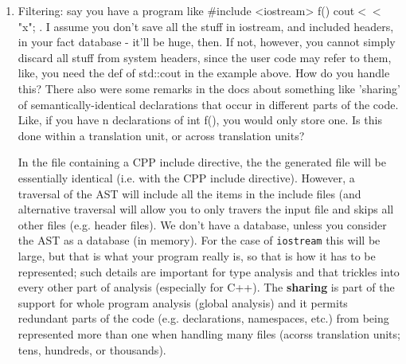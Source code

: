 \begin{enumerate}
   We support whole program analysis by permitting the AST's from several files to be
   merged, this saves space in the header file duplication and provides an efficient means
   of handling large scale applications.  This work is currently experemental, and works
   on a 100K C program seperated over 50+ files, but is less robust for C++ code.  It is 
   ongoing research work.  A less scalable alternative is to just list multiple source
   files on the command line, however this is not a meaningful solution for applications
   contianing hundreds or thousands of files.  C++ template details are addressed by
   having each file instantiate all the templates that it requires and then we record
   which of these are used by the file.  All used instantiated templates are represented
   as specialized templates in the AST and any transformed instatiated (specialized)
   templates are output as template specializations, else the backend compiler is used to
   instantiate the required templates so that we can reduce the code generation required.


\item Filtering: say you have a program like \#include <iostream> f() { cout$<<$"x"; }. I
    assume you don't save all the stuff in iostream, and included headers, in your fact
    database - it'll be huge, then. If not, however, you cannot simply discard all stuff
    from system headers, since the user code may refer to them, like, you need the def of
    std::cout in the example above. How do you handle this?
    There also were some remarks in the docs about something like 'sharing' of
    semantically-identical declarations that occur in different parts of the code. Like,
    if you have n declarations of int f(), you would only store one. Is this done within a
    translation unit, or across translation units?

    In the file containing a CPP include directive, the the generated file will be
    essentially identical (i.e. with the CPP include directive).  However, a traversal of the AST
    will include all the items in the include files (and alternative traversal will allow
    you to only travers the input file and skips all other files (e.g. header files).  
    We don't have a database, unless you
    consider the AST as a database (in memory). For the case of {\tt iostream} this will
    be large, but that is what your program really is, so that is how it has to be
    represented; such details are important for type analysis and that trickles into
    every other part of analysis (especially for C++).  The {\bf sharing} is part of
    the support for whole program analysis (global analysis) and it permits redundant 
    parts of the code (e.g. declarations, namespaces, etc.) from being represented
    more than one when handling many files (acorss translation units; tens, hundreds, 
    or thousands).



\end{enumerate}
